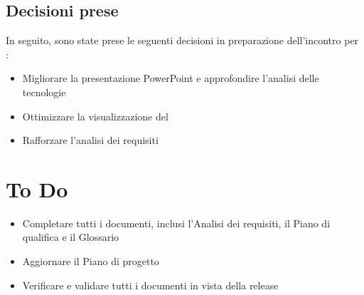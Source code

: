 \documentclass[a4paper, 12pt]{article}
\begin{document}
\subsection{Decisioni prese}
In seguito, sono state prese le seguenti decisioni in preparazione dell'incontro per :
\begin{itemize}
    \item Migliorare la presentazione PowerPoint e approfondire l'analisi delle tecnologie
    \item Ottimizzare la visualizzazione del  
    \item Rafforzare l’analisi dei requisiti
\end{itemize}

\section{To Do}
\begin{itemize}
    \item Completare tutti i documenti, inclusi l'Analisi dei requisiti, il Piano di qualifica e il Glossario
    \item Aggiornare il Piano di progetto
    \item Verificare e validare tutti i documenti in vista della release
\end{itemize}
\end{document}
